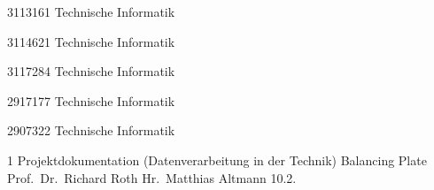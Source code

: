 \documentclass[12pt,a4paper,bibliography=totoc,listof=totoc]{scrartcl}
\begin{document}
{3113161}						%
{Technische Informatik}			%

{3114621}						%
{Technische Informatik}			%

{3117284}						%
{Technische Informatik}			%

{2917177}						%
{Technische Informatik}			%

{2907322}						%
{Technische Informatik}			%


\MyTitelseite{}
{1}								%
{Projektdokumentation (Datenverarbeitung in der Technik)}			%
{Balancing Plate}				%
{Prof.\ Dr.\ Richard Roth}   %
{Hr.\ Matthias Altmann}	%
{10.2.\the\year}				%

\setcounter{page}{1} 




\tableofcontents
\pagebreak
\end{document}
